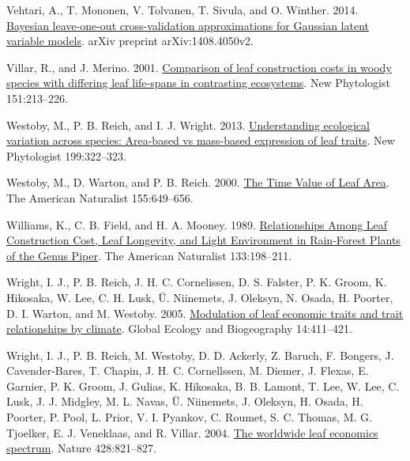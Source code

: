 \documentclass[
  12pt,
]{article}
\begin{document}
\begin{CSLReferences}{1}{0}
\leavevmode{}%
Vehtari, A., T. Mononen, V. Tolvanen, T. Sivula, and O. Winther. 2014. \href{https://arxiv.org/abs/1408.4050v2}{Bayesian leave-one-out cross-validation approximations for {Gaussian} latent variable models}. arXiv preprint arXiv:1408.4050v2.

\leavevmode{}%
Villar, R., and J. Merino. 2001. \href{https://doi.org/10.1046/j.1469-8137.2001.00147.x}{Comparison of leaf construction costs in woody species with differing leaf life-spans in contrasting ecosystems}. New Phytologist 151:213--226.

\leavevmode{}%
Westoby, M., P. B. Reich, and I. J. Wright. 2013. \href{https://doi.org/10.1111/nph.12345}{Understanding ecological variation across species: {Area}-based vs mass-based expression of leaf traits}. New Phytologist 199:322--323.

\leavevmode{}%
Westoby, M., D. Warton, and P. B. Reich. 2000. \href{https://doi.org/10.1086/303346}{The {Time Value} of {Leaf Area}}. The American Naturalist 155:649--656.

\leavevmode{}%
Williams, K., C. B. Field, and H. A. Mooney. 1989. \href{https://doi.org/10.1086/284910}{Relationships {Among Leaf Construction Cost}, {Leaf Longevity}, and {Light Environment} in {Rain}-{Forest Plants} of the {Genus Piper}}. The American Naturalist 133:198--211.

\leavevmode{}%
Wright, I. J., P. B. Reich, J. H. C. Cornelissen, D. S. Falster, P. K. Groom, K. Hikosaka, W. Lee, C. H. Lusk, Ü. Niinemets, J. Oleksyn, N. Osada, H. Poorter, D. I. Warton, and M. Westoby. 2005. \href{https://doi.org/10.1111/j.1466-822x.2005.00172.x}{Modulation of leaf economic traits and trait relationships by climate}. Global Ecology and Biogeography 14:411--421.

\leavevmode{}%
Wright, I. J., P. B. Reich, M. Westoby, D. D. Ackerly, Z. Baruch, F. Bongers, J. Cavender-Bares, T. Chapin, J. H. C. Cornellssen, M. Diemer, J. Flexas, E. Garnier, P. K. Groom, J. Gulias, K. Hikosaka, B. B. Lamont, T. Lee, W. Lee, C. Lusk, J. J. Midgley, M. L. Navas, Ü. Niinemets, J. Oleksyn, H. Osada, H. Poorter, P. Pool, L. Prior, V. I. Pyankov, C. Roumet, S. C. Thomas, M. G. Tjoelker, E. J. Veneklaas, and R. Villar. 2004. \href{https://doi.org/10.1038/nature02403}{The worldwide leaf economics spectrum}. Nature 428:821--827.


\end{CSLReferences}
\end{document}
